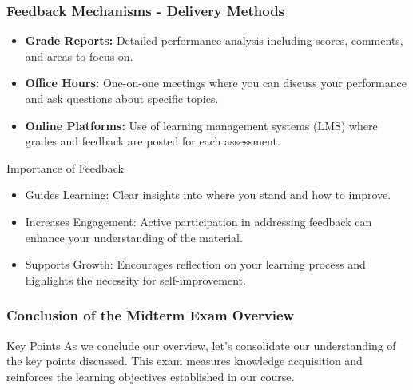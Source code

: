 \documentclass[aspectratio=169]{beamer}
\begin{document}
\begin{frame}[fragile]
    \frametitle{Feedback Mechanisms - Delivery Methods}
    \begin{itemize}
        \item \textbf{Grade Reports:} Detailed performance analysis including scores, comments, and areas to focus on.
        \item \textbf{Office Hours:} One-on-one meetings where you can discuss your performance and ask questions about specific topics.
        \item \textbf{Online Platforms:} Use of learning management systems (LMS) where grades and feedback are posted for each assessment.
    \end{itemize}
    
    \begin{block}{Importance of Feedback}
        \begin{itemize}
            \item Guides Learning: Clear insights into where you stand and how to improve.
            \item Increases Engagement: Active participation in addressing feedback can enhance your understanding of the material.
            \item Supports Growth: Encourages reflection on your learning process and highlights the necessity for self-improvement.
        \end{itemize}
    \end{block}
\end{frame}

\begin{frame}[fragile]
    \frametitle{Conclusion of the Midterm Exam Overview}
    \begin{block}{Key Points}
        As we conclude our overview, let's consolidate our understanding of the key points discussed.
        This exam measures knowledge acquisition and reinforces the learning objectives established in our course.
    \end{block}
\end{frame}
\end{document}
